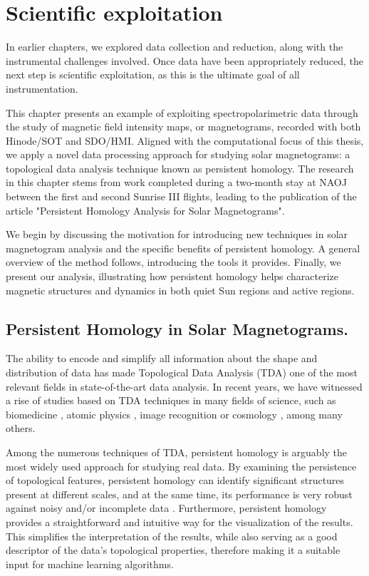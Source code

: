 \chapter{\label{CH:Science}Scientific exploitation}


In earlier chapters, we explored data collection and reduction, along with the instrumental challenges involved. Once data have been appropriately reduced, the next step is scientific exploitation, as this is the ultimate goal of all instrumentation.

This chapter presents an example of exploiting spectropolarimetric data through the study of magnetic field intensity maps, or magnetograms, recorded with both Hinode/SOT and SDO/HMI. Aligned with the computational focus of this thesis, we apply a novel data processing approach for studying solar magnetograms: a topological data analysis technique known as persistent homology. The research in this chapter stems from work completed during a two-month stay at NAOJ between the first and second Sunrise III flights, leading to the publication of the article "Persistent Homology Analysis for Solar Magnetograms".

We begin by discussing the motivation for introducing new techniques in solar magnetogram analysis and the specific benefits of persistent homology. A general overview of the method follows, introducing the tools it provides. Finally, we present our analysis, illustrating how persistent homology helps characterize magnetic structures and dynamics in both quiet Sun regions and active regions.

\section{Persistent Homology in Solar Magnetograms.}
The ability to encode and simplify all information about the shape and distribution of data has made Topological Data Analysis (TDA) one of the most relevant fields in state-of-the-art data analysis. In recent years, we have witnessed a rise of studies based on TDA techniques in many fields of science, such as biomedicine \citep{brain-PH}, atomic physics \citep{atomic}, image recognition \citep{Image-recognition} or cosmology \citep{cosmology}, among many others.

Among the numerous techniques of TDA, persistent homology is arguably the most widely used approach for studying real data. By examining the persistence of topological features, persistent homology can identify significant structures present at different scales, and at the same time, its performance is very robust against noisy and/or incomplete data \citep{PH_noisy}. Furthermore, persistent homology provides a straightforward and intuitive way for the visualization of the results. This simplifies the interpretation of the results, while also serving as a good descriptor of the data's topological properties, therefore making it a suitable input for machine learning algorithms.

